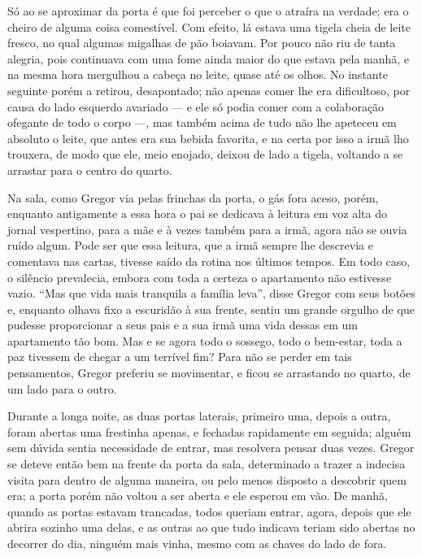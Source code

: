 Só ao se aproximar da porta é que foi perceber o que o atraíra na verdade;
era o cheiro de alguma coisa comestível. Com efeito, lá estava uma tigela
cheia de leite fresco, no qual algumas migalhas de pão boiavam. Por pouco
não riu de tanta alegria, pois continuava com uma fome ainda maior do que
estava pela manhã, e na mesma hora mergulhou a cabeça no leite, quase até
os olhos. No instante seguinte porém a retirou, desapontado; não apenas
comer lhe era dificultoso, por causa do lado esquerdo avariado --- e ele só
podia comer com a colaboração ofegante de todo o corpo ---, mas também
acima de tudo não lhe apeteceu em absoluto o leite, que antes era sua
bebida favorita, e na certa por isso a irmã lho trouxera, de modo que ele,
meio enojado, deixou de lado a tigela, voltando a se arrastar para o
centro do quarto.

Na sala, como Gregor via pelas frinchas da porta, o gás fora aceso, porém,
enquanto antigamente a essa hora o pai se dedicava à leitura em voz alta
do jornal vespertino, para a mãe e à vezes também para a irmã, agora não
se ouvia ruído algum. Pode ser que essa leitura, que a irmã sempre lhe
descrevia e comentava nas cartas, tivesse saído da rotina nos últimos
tempos. Em todo caso, o silêncio prevalecia, embora com toda a certeza o
apartamento não estivesse vazio. “Mas que vida mais tranquila a família
leva”, disse Gregor com seus botões e, enquanto olhava fixo a escuridão à
sua frente, sentiu um grande orgulho de que pudesse proporcionar a seus
pais e a sua irmã uma vida dessas em um apartamento tão bom. Mas e se
agora todo o sossego, todo o bem-estar, toda a paz tivessem de chegar a um
terrível fim? Para não se perder em tais pensamentos, Gregor preferiu se
movimentar, e ficou se arrastando no quarto, de um lado para o outro.

Durante a longa noite, as duas portas laterais, primeiro uma, depois a
outra, foram abertas uma frestinha apenas, e fechadas rapidamente em
seguida; alguém sem dúvida sentia necessidade de entrar, mas resolvera
pensar duas vezes. Gregor se deteve então bem na frente da porta da sala,
determinado a trazer a indecisa visita para dentro de alguma maneira, ou
pelo menos disposto a descobrir quem era; a porta porém não voltou a ser
aberta e ele esperou em vão. De manhã, quando as portas estavam trancadas,
todos queriam entrar, agora, depois que ele abrira sozinho uma delas, e as
outras ao que tudo indicava teriam sido abertas no decorrer do dia,
ninguém mais vinha, mesmo com as chaves do lado de fora.

